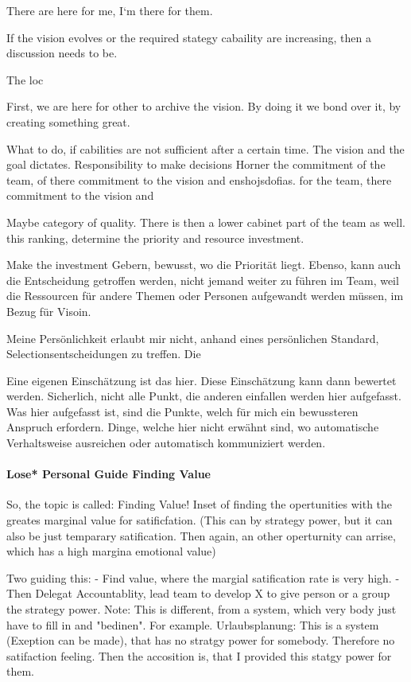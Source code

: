 There are here for me, I‘m there for them.

If the vision evolves or the required stategy cabaility are increasing, then a discussion needs to be.


The loc

First, we are here for other to archive the vision. By doing it we bond over it, by creating something great.

What to do, if cabilities are not sufficient after a certain time. 
The vision and the goal dictates.
Responsibility to make decisions 
Horner the commitment of the team, of there commitment to the vision and enshojsdofias.
for the team, there commitment to the vision and 

Maybe category of quality.
There is then a lower cabinet part of the team as well. 
this ranking, determine the priority and resource investment.

Make the investment Gebern, bewusst, wo die Priorität liegt.
Ebenso, kann auch die Entscheidung getroffen werden, nicht jemand weiter zu führen im Team, weil die Ressourcen für andere Themen oder Personen aufgewandt werden müssen, im Bezug für Visoin.

Meine Persönlichkeit erlaubt mir nicht, anhand eines persönlichen Standard, Selectionsentscheidungen zu treffen.
Die 

Eine eigenen Einschätzung ist das hier.
Diese Einschätzung kann dann bewertet werden.
Sicherlich, nicht alle Punkt, die anderen einfallen werden hier aufgefasst. 
Was hier aufgefasst ist, sind die Punkte, welch für mich ein bewussteren Anspruch erfordern. Dinge, welche hier nicht erwähnt sind, wo automatische Verhaltsweise ausreichen oder automatisch kommuniziert werden.


\paragraph{Lose* Personal Guide Finding Value}


So, the topic is called: Finding Value!
Inset of finding the opertunities with the greates marginal value for satificfation. (This can by strategy power, but it can also be just temparary satification. Then again, an other operturnity can arrise, which has a high margina emotional value)

Two guiding this:
- Find value, where the margial satification rate is very high. 
- Then Delegat  Accountablity, lead team to develop X to give person or a group the strategy power.
Note: This is different, from a system, which very body just have to fill in and "bedinen". For example. Urlaubsplanung: This is a system (Exeption can be made), that has no stratgy power for somebody. Therefore no satifaction feeling. Then the accosition is, that I provided this statgy power for them.

